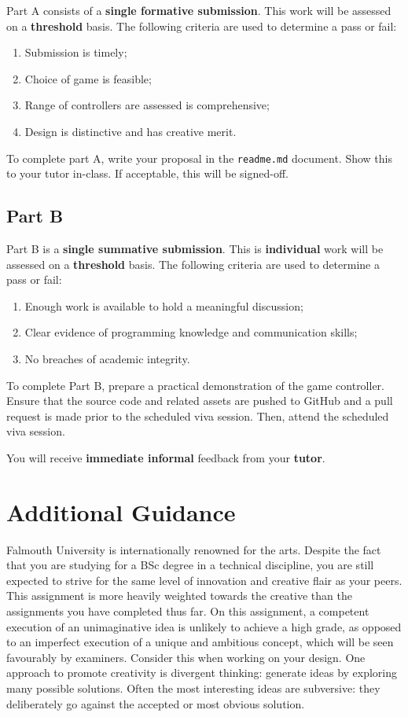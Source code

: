\documentclass{../fal_assignment}
\begin{document}
Part A consists of a \textbf{single formative submission}. This work will be assessed on a \textbf{threshold} basis. The following criteria are used to determine a pass or fail:

\begin{enumerate}[label=(\alph*)]
	\item Submission is timely;
	\item Choice of game is feasible;
	\item Range of controllers are assessed is comprehensive;
	\item Design is distinctive and has creative merit.
\end{enumerate}

To complete part A, write your proposal in the \texttt{readme.md} document. Show this to your tutor in-class. If acceptable, this will be signed-off.

\subsection*{Part B}

Part B is a \textbf{single summative submission}. This is \textbf{individual} work will be assessed on a \textbf{threshold} basis. The following criteria are used to determine a pass or fail: 

\begin{enumerate}[label=(\alph*)]
	\item Enough work is available to hold a meaningful discussion; 
	\item Clear evidence of programming knowledge and communication skills; 
	\item No breaches of academic integrity. 
\end{enumerate}

To complete Part B, prepare a practical demonstration of the game controller. Ensure that the source code and related assets are pushed to GitHub and a pull request is made prior to the scheduled viva session. Then, attend the scheduled viva session. 

You will receive \textbf{immediate informal} feedback from your \textbf{tutor}.

\section*{Additional Guidance}
Falmouth University is internationally renowned for the arts. Despite the fact that you are studying for a BSc degree in a technical discipline, you are still expected to strive for the same level of innovation and creative flair as your peers. This assignment is more heavily weighted towards the creative than the assignments you have completed thus far. On this assignment, a competent execution of an unimaginative idea is unlikely to achieve a high grade, as opposed to an imperfect execution of a unique and ambitious concept, which will be seen favourably by examiners. Consider this when working on your design. One approach to promote creativity is divergent thinking: generate ideas by exploring many possible solutions. Often the most interesting ideas are subversive: they deliberately go against the accepted or most obvious solution.
\end{document}
